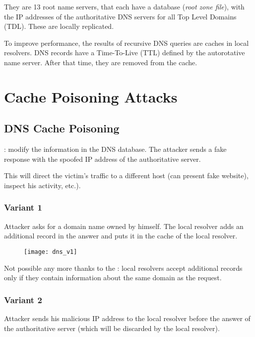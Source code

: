 They are 13 root name servers, that each have a database (\textit{root zone file}), with the IP addresses of the authoritative DNS servers for all Top Level Domains (TDL). These are locally replicated.

To improve performance, the results of recursive DNS queries are caches in local resolvers. DNS records have a Time-To-Live (TTL) defined by the autorotative name server. After that time, they are removed from the cache.

\chapter{Cache Poisoning Attacks}

\section{DNS Cache Poisoning}

 : modify the information in the DNS database. The attacker sends a fake response with the spoofed IP address of the authoritative server.

This will direct the victim's traffic to a different host (can present fake website), inspect his activity, etc.).

\subsection{Variant 1}

Attacker asks for a domain name owned by himself. The local resolver adds an additional record in the answer and puts it in the cache of the local resolver.

\begin{figure}[H]
    \centering
    \texttt{[image: dns\_v1]}
\end{figure}

Not possible any more thanks to the  : local resolvers accept additional records only if they contain information about the same domain as the request.

\subsection{Variant 2}

Attacker sends his malicious IP address to the local resolver before the answer of the authoritative server (which will be discarded by the local resolver).

